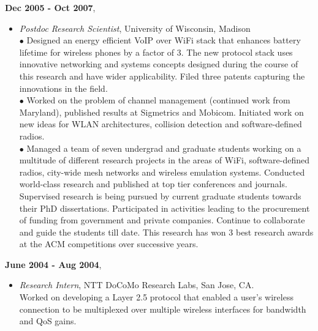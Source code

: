\begin{resume}
\begin{itemize}
    \end{itemize}

{\bf Dec 2005 - Oct 2007},
    \begin{itemize}
         \item[] {\it Postdoc Research Scientist}, University of Wisconsin, Madison\\
	        $\bullet$ Designed an energy efficient VoIP over WiFi stack that
		enhances battery lifetime for wireless phones by a factor of 3.
		The new protocol stack uses innovative networking and systems
		concepts designed during the course of this research and have
		wider applicability. Filed three patents capturing the
		innovations in the field.\\
		$\bullet$ Worked on the problem of channel management (continued work from Maryland), published
		results at Sigmetrics and Mobicom. Initiated work on new ideas for WLAN architectures, collision detection and software-defined radios.\\
                $\bullet$ Managed a team of seven undergrad and graduate students working on a multitude of different research
projects  in the areas of WiFi, software-defined radios, city-wide mesh
networks and wireless emulation systems. Conducted world-class research and
published at top tier conferences and journals. Supervised research is being
pursued by current graduate students towards their PhD dissertations. Participated in activities
leading to the procurement of funding from government and private companies. Continue to collaborate and guide the
students till date. This research has won 3 best research awards at the ACM competitions over successive years.
    \end{itemize}

 {\bf June 2004 - Aug 2004},   	
    \begin{itemize}
         \item[] {\it Research Intern},  NTT DoCoMo Research Labs, San Jose, CA.\\
		 Worked on developing a Layer 2.5 protocol that enabled a user's wireless connection to be
                 multiplexed over multiple wireless interfaces for bandwidth and QoS gains.
		 

\end{itemize}
\end{resume}

